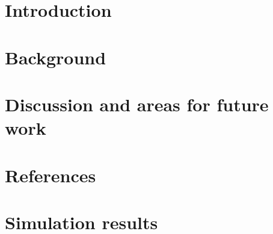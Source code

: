 \documentclass[11pt,fullpage,rotate]{report}
\begin{document}
\pagestyle{empty}

\newpage


\newpage
   

\newpage
{}
\pagestyle{plain}

\newpage


\newpage
\tableofcontents
\newpage
\listoffigures
\newpage
\listoftables

\newpage
{}
\chapter{Introduction}
\label{intro}


\chapter{Background}
\label{background}



\chapter{Discussion and areas for future work}
\label{conclusion}


\chapter{References}
\label{references}


\appendix
\chapter{Simulation results}
\label{simappendix}

\end{document}
